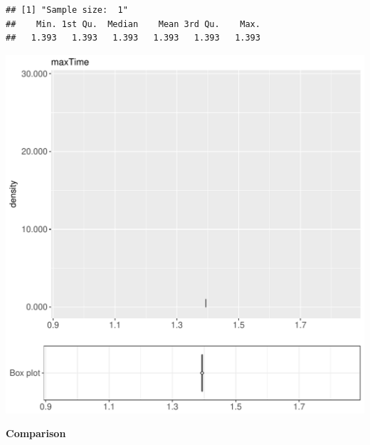 \documentclass{article}\usepackage[]{graphicx}\usepackage[]{color}
\makeatletter
\def\maxwidth{ %
  \ifdim\Gin@nat@width>\linewidth
    \linewidth
  \else
    \Gin@nat@width
  \fi
}
\newenvironment{kframe}{%
 \def\at@end@of@kframe{}%
 \ifinner\ifhmode%
  \def\at@end@of@kframe{\end{minipage}}%
  \begin{minipage}{\columnwidth}%
 \fi\fi%
 \def\FrameCommand##1{\hskip\@totalleftmargin \hskip-\fboxsep
 \colorbox{shadecolor}{##1}\hskip-\fboxsep
     \hskip-\linewidth \hskip-\@totalleftmargin \hskip\columnwidth}%
 \MakeFramed {\advance\hsize-\width
   \@totalleftmargin\z@ \linewidth\hsize
   \@setminipage}}%
 {\par\unskip\endMakeFramed%
 \at@end@of@kframe}
\newenvironment{knitrout}{}{} %
\makeatother
\begin{document}
\begin{knitrout}
\color{fgcolor}\begin{kframe}
\begin{verbatim}
## [1] "Sample size:  1"
##    Min. 1st Qu.  Median    Mean 3rd Qu.    Max. 
##   1.393   1.393   1.393   1.393   1.393   1.393
\end{verbatim}


{\ttfamily\noindent\bfseries{}}\end{kframe}
\includegraphics[width=\maxwidth]{figure/RH2_noCache_small-1} 

\end{knitrout}
  
 \textbf{Comparison}
  
\end{document}
